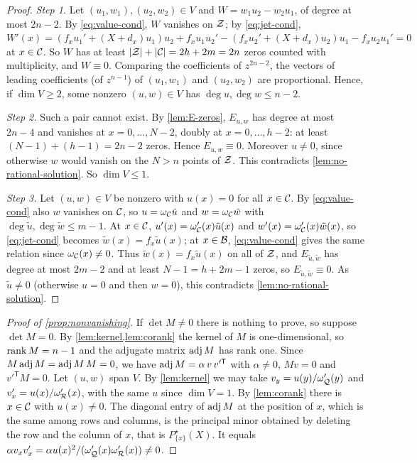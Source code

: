 \begin{proof}
\emph{Step 1.} Let $(u_1,w_1),(u_2,w_2)\in V$ and $W=w_1u_2-w_2u_1$, of degree at most $2n-2$. By
\eqref{eq:value-cond}, $W$ vanishes on $\mathcal{Z}$; by \eqref{eq:jet-cond},
$W'(x)=(f_xu_1'+(X+d_x)u_1)u_2+f_xu_1u_2'-(f_xu_2'+(X+d_x)u_2)u_1-f_xu_2u_1'=0$ at $x\in\mathcal{C}$. So
$W$ has at least $\lvert \mathcal{Z}\rvert+\lvert \mathcal{C}\rvert=2h+2m=2n$ zeros counted with multiplicity, and $W\equiv0$.
Comparing the coefficients of $z^{2n-2}$, the vectors of leading coefficients (of $z^{n-1}$) of
$(u_1,w_1)$ and $(u_2,w_2)$ are proportional. Hence, if $\dim V\ge2$, some nonzero
$(u,w)\in V$ has $\deg u,\deg w\le n-2$.

\emph{Step 2.} Such a pair cannot exist. By \cref{lem:E-zeros}, $E_{u,w}$ has degree at most
$2n-4$ and vanishes at $x=0,\dots,N-2$, doubly at $x=0,\dots,h-2$: at least
$(N-1)+(h-1)=2n-2$ zeros. Hence $E_{u,w}\equiv0$. Moreover $u\ne0$, since otherwise $w$ would
vanish on the $N>n$ points of $\mathcal{Z}$. This contradicts \cref{lem:no-rational-solution}. So
$\dim V\le1$.

\emph{Step 3.} Let $(u,w)\in V$ be nonzero with $u(x)=0$ for all $x\in\mathcal{C}$. By
\eqref{eq:value-cond} also $w$ vanishes on $\mathcal{C}$, so $u=\omega_{\mathcal{C}}\tilde u$ and
$w=\omega_{\mathcal{C}}\tilde w$ with $\deg\tilde u,\deg\tilde w\le m-1$. At $x\in\mathcal{C}$,
$u'(x)=\omega_{\mathcal{C}}'(x)\tilde u(x)$ and $w'(x)=\omega_{\mathcal{C}}'(x)\tilde w(x)$, so
\eqref{eq:jet-cond} becomes $\tilde w(x)=f_x\tilde u(x)$; at $x\in\mathcal{B}$, \eqref{eq:value-cond}
gives the same relation since $\omega_{\mathcal{C}}(x)\ne0$. Thus $\tilde w(x)=f_x\tilde u(x)$ on all of
$\mathcal{Z}$, and $E_{\tilde u,\tilde w}$ has degree at most $2m-2$ and at least $N-1=h+2m-1$ zeros, so
$E_{\tilde u,\tilde w}\equiv0$. As $\tilde u\ne0$ (otherwise $u=0$ and then $w=0$), this
contradicts \cref{lem:no-rational-solution}.
\end{proof}

\begin{proof}[Proof of \cref{prop:nonvanishing}]
If $\det M\ne0$ there is nothing to prove, so suppose $\det M=0$. By \cref{lem:kernel,lem:corank} the kernel of $M$ is one-dimensional, so
$\operatorname{rank} M=n-1$ and the adjugate matrix $\operatorname{adj} M$ has rank one. Since $M\operatorname{adj} M=\operatorname{adj} M\,M=0$, we have
$\operatorname{adj} M=\alpha\,v\,v'^{\mathsf T}$ with $\alpha\ne0$, $Mv=0$ and $v'^{\mathsf T}M=0$. Let $(u,w)$ span
$V$. By \cref{lem:kernel} we may take $v_y=u(y)/\omega_{\mathcal{Q}}'(y)$ and $v'_x=u(x)/\omega_{\mathcal{R}}'(x)$,
with the same $u$ since $\dim V=1$. By \cref{lem:corank} there is $x\in\mathcal{C}$ with $u(x)\ne0$. The
diagonal entry of $\operatorname{adj} M$ at the position of $x$, which is the same among rows and columns, is
the principal minor obtained by deleting the row and the column of $x$, that is
$P^\star_{\{x\}}(X)$. It equals $\alpha v_xv'_x=\alpha u(x)^2/(\omega_{\mathcal{Q}}'(x)\omega_{\mathcal{R}}'(x))\ne0$.
\end{proof}

